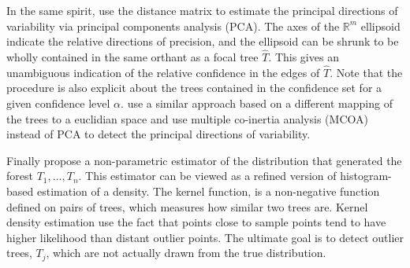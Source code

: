 
In the same spirit, \citet{willis2016confidence} use the distance matrix to
estimate  the  principal  directions  of  variability  via principal components analysis (PCA). The axes of the $\mathbb{R}^m$ ellipsoid indicate the relative directions of precision, and the ellipsoid can be shrunk  to be wholly contained in the same orthant as a focal tree $\hat{T}$. This gives an unambiguous indication of the relative confidence in the edges of $\hat{T}$. Note that the procedure is also explicit about the trees contained in the confidence set for a given confidence level $\alpha$. \citet{de2012phylo} use a similar approach based on a different mapping of the trees to a euclidian space and use multiple co-inertia analysis (MCOA) instead of PCA to detect the principal directions of variability.

Finally \citet{weyenberg2014kdetrees}  propose  a non-parametric estimator of the distribution that generated the forest $T_1,\ldots,T_n$.  This estimator can be viewed as a refined version of histogram-based estimation of a density. The kernel function, is a non-negative function defined on pairs of trees, which measures how similar two trees are. Kernel density estimation use the fact that points close to sample points tend to have higher likelihood than distant outlier points.  The ultimate goal is to detect outlier trees, $T_j$, which are not actually drawn from the true distribution.



